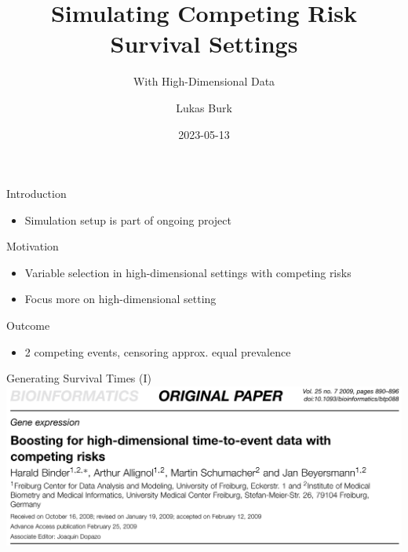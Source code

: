 \documentclass{beamer}
\title{Simulating Competing Risk Survival Settings}
\subtitle{With High-Dimensional Data}
\author{Lukas Burk}
\date{2023-05-13}
\providecommand{\tightlist}{%
  \setlength{\itemsep}{0pt}\setlength{\parskip}{0pt}}
\begin{document}
\frame{\maketitle}

\begin{frame}{Introduction}
\protect\hypertarget{introduction}{}
\begin{itemize}
\tightlist
\item
  Simulation setup is part of ongoing project
\end{itemize}

\begin{block}{Motivation}
\protect\hypertarget{motivation}{}
\begin{itemize}
\tightlist
\item
  Variable selection in high-dimensional settings with competing risks
\item
  Focus more on high-dimensional setting
\end{itemize}
\end{block}

\begin{block}{Outcome}
\protect\hypertarget{outcome}{}
\begin{itemize}
\tightlist
\item
  2 competing events, censoring approx. equal prevalence
\end{itemize}
\end{block}
\end{frame}

\begin{frame}{Generating Survival Times (I)}
\protect\hypertarget{generating-survival-times-i}{}
\includegraphics[width=0.95\linewidth]{img/binder2009}

\textcite{binder2009boostinghighdimensional}
\end{frame}
\end{document}
